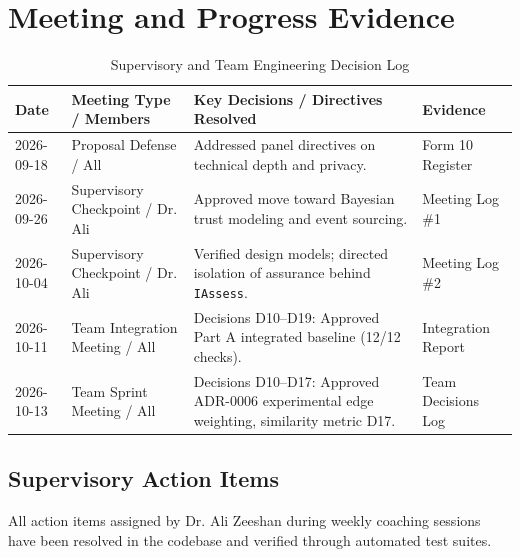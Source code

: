 \chapter{Meeting and Progress Evidence}
\label{app:meetings_evidence}

\begin{table}[htbp]
\centering
\caption{Supervisory and Team Engineering Decision Log}
\label{tab:meeting_log}
\small
\begin{tabularx}{\textwidth}{l p{4.5cm} p{6cm} l}
\toprule
\textbf{Date} & \textbf{Meeting Type / Members} & \textbf{Key Decisions / Directives Resolved} & \textbf{Evidence} \\
\midrule
2026-09-18 & Proposal Defense / All & Addressed panel directives on technical depth and privacy. & Form 10 Register \\
2026-09-26 & Supervisory Checkpoint / Dr. Ali & Approved move toward Bayesian trust modeling and event sourcing. & Meeting Log \#1 \\
2026-10-04 & Supervisory Checkpoint / Dr. Ali & Verified design models; directed isolation of assurance behind \texttt{IAssess}. & Meeting Log \#2 \\
2026-10-11 & Team Integration Meeting / All & Decisions D10--D19: Approved Part A integrated baseline (12/12 checks). & Integration Report \\
2026-10-13 & Team Sprint Meeting / All & Decisions D10--D17: Approved ADR-0006 experimental edge weighting, similarity metric D17. & Team Decisions Log \\
\bottomrule
\end{tabularx}
\end{table}

\section*{Supervisory Action Items}
All action items assigned by Dr. Ali Zeeshan during weekly coaching sessions have been resolved in the codebase and verified through automated test suites.
